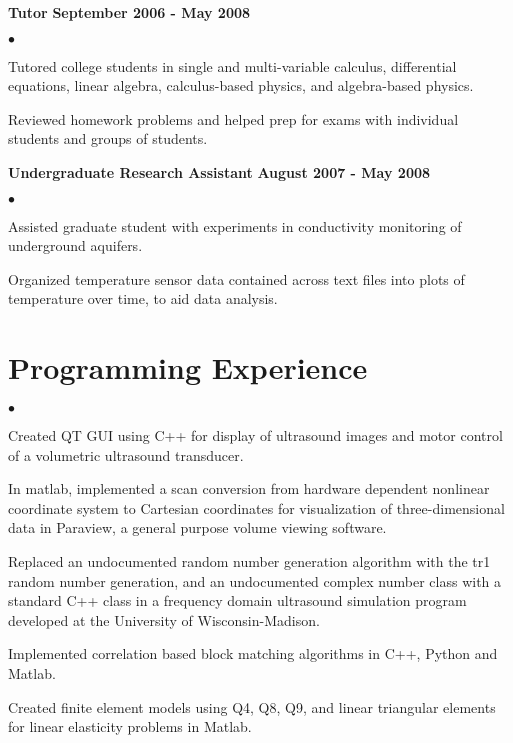 \documentclass[margin,line]{res}
\newenvironment{list2}{
  \begin{list}{$\bullet$}{%
      \setlength{\itemsep}{0in}
      \setlength{\parsep}{0in} \setlength{\parskip}{0in}
      \setlength{\topsep}{0in} \setlength{\partopsep}{0in}
      \setlength{\leftmargin}{0.2in}}}{\end{list}}
\begin{document}
\begin{resume}
\vspace{-.3cm}
{\bf Tutor} \hfill {\bf September 2006 - May 2008} \\
\vspace{-.2cm}
\begin{list2}
\item Tutored college students in single and multi-variable calculus, differential equations, linear algebra, calculus-based physics, and algebra-based physics.
\item Reviewed homework problems and helped prep for exams with individual students and groups of students.
\end{list2}

\vspace{.3cm}

\vspace{-.3cm}
{\bf Undergraduate Research Assistant}  \hfill {\bf August 2007 - May 2008} \\
\vspace{-.2cm}
\begin{list2}
\item Assisted graduate student with experiments in conductivity monitoring of underground aquifers.
\item Organized temperature sensor data contained across text files into plots of temperature over time, to aid data analysis.
\end{list2}

\section{\sc Programming Experience}
\begin{list2}
\item Created QT GUI using C++ for display of ultrasound images and motor control of a volumetric ultrasound transducer.
\item In matlab, implemented a scan conversion from hardware dependent nonlinear coordinate system to Cartesian coordinates for visualization of 
      three-dimensional data in Paraview, a general purpose volume viewing software.
\item Replaced an undocumented random number generation algorithm with the tr1 random number generation, and an undocumented complex number class with a standard C++ class in a frequency domain ultrasound simulation program developed at the University of Wisconsin-Madison. 
\item Implemented correlation based block matching algorithms in C++, Python and Matlab.
\item Created finite element models using Q4, Q8, Q9, and linear triangular elements for linear elasticity problems in Matlab.
\end{list2}



\end{resume}
\end{document}
